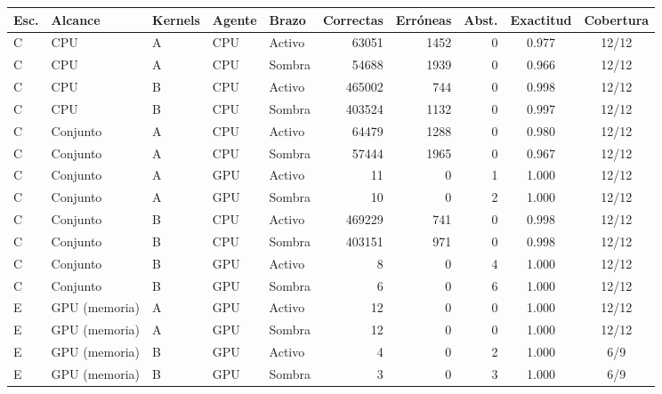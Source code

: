 \begin{tabular}{@{}lllllrrrcc@{}}
\toprule
\textbf{Esc.} & \textbf{Alcance} & \textbf{Kernels} & \textbf{Agente} & \textbf{Brazo} & \textbf{Correctas} & \textbf{Erróneas} & \textbf{Abst.} & \textbf{Exactitud} & \textbf{Cobertura} \\
\midrule
C & CPU & A & CPU & Activo & 63051 & 1452 & 0 & 0.977 & 12/12 \\
C & CPU & A & CPU & Sombra & 54688 & 1939 & 0 & 0.966 & 12/12 \\
C & CPU & B & CPU & Activo & 465002 & 744 & 0 & 0.998 & 12/12 \\
C & CPU & B & CPU & Sombra & 403524 & 1132 & 0 & 0.997 & 12/12 \\
C & Conjunto & A & CPU & Activo & 64479 & 1288 & 0 & 0.980 & 12/12 \\
C & Conjunto & A & CPU & Sombra & 57444 & 1965 & 0 & 0.967 & 12/12 \\
C & Conjunto & A & GPU & Activo & 11 & 0 & 1 & 1.000 & 12/12 \\
C & Conjunto & A & GPU & Sombra & 10 & 0 & 2 & 1.000 & 12/12 \\
C & Conjunto & B & CPU & Activo & 469229 & 741 & 0 & 0.998 & 12/12 \\
C & Conjunto & B & CPU & Sombra & 403151 & 971 & 0 & 0.998 & 12/12 \\
C & Conjunto & B & GPU & Activo & 8 & 0 & 4 & 1.000 & 12/12 \\
C & Conjunto & B & GPU & Sombra & 6 & 0 & 6 & 1.000 & 12/12 \\
E & GPU (memoria) & A & GPU & Activo & 12 & 0 & 0 & 1.000 & 12/12 \\
E & GPU (memoria) & A & GPU & Sombra & 12 & 0 & 0 & 1.000 & 12/12 \\
E & GPU (memoria) & B & GPU & Activo & 4 & 0 & 2 & 1.000 & 6/9 \\
E & GPU (memoria) & B & GPU & Sombra & 3 & 0 & 3 & 1.000 & 6/9 \\
\bottomrule
\end{tabular}
